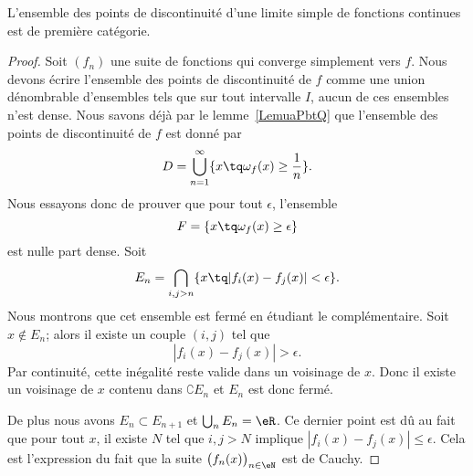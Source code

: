 \begin{theorem}
    L'ensemble des points de discontinuité d'une limite simple de fonctions continues est de première catégorie.
\end{theorem}

\begin{proof}
    Soit \( (f_n)\) une suite de fonctions qui converge simplement vers \( f\). Nous devons écrire l'ensemble des points de discontinuité de \( f\) comme une union dénombrable d'ensembles tels que sur tout intervalle \( I\), aucun de ces ensembles n'est dense. Nous savons déjà par le lemme~\ref{LemuaPbtQ} que l'ensemble des points de discontinuité  de \( f\) est donné par
    \begin{equation}
        D=\bigcup_{n=1}^{\infty}\{ x\tq \omega_f(x)\geq \frac{1}{  n } \}.
    \end{equation}
    Nous essayons donc de prouver que pour tout \( \epsilon\), l'ensemble
    \begin{equation}
        F=\{ x\tq \omega_f(x)\geq \epsilon \}
    \end{equation}
    est nulle part dense. Soit
    \begin{equation}
        E_n=\bigcap_{i,j>n}\{ x\tq | f_i(x)-f_j(x) |<\epsilon \}.
    \end{equation}
    Nous montrons que cet ensemble est fermé en étudiant le complémentaire. Soit \( x\notin E_n\); alors il existe un couple \( (i,j)\) tel que
    \begin{equation}
        | f_i(x)-f_j(x) |>\epsilon.
    \end{equation}
    Par continuité, cette inégalité reste valide dans un voisinage de \( x\). Donc il existe un voisinage de \( x\) contenu dans \( \complement E_n\) et \( E_n\) est donc fermé.

    De plus nous avons \( E_n\subset E_{n+1}\) et \( \bigcup_nE_n=\eR\). Ce dernier point est dû au fait que pour tout \( x\), il existe \( N\) tel que \( i,j>N\) implique \( | f_i(x)-f_j(x) |\leq \epsilon\). Cela est l'expression du fait que la suite \( \big( f_n(x) \big)_{n\in \eN}\) est de Cauchy.


\end{proof}
